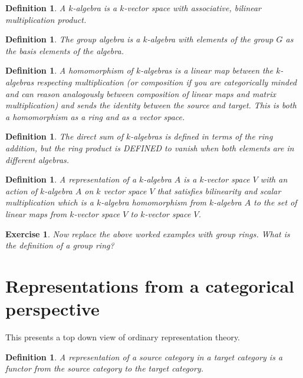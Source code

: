 \documentclass{tufte-book}
\newtheorem{definition}[theorem]{Definition}
\newtheorem{exercise}[theorem]{Exercise}
\begin{document}
\begin{definition}
	A $k$-algebra is a $k$-vector space with associative, bilinear multiplication product.
\end{definition}

\begin{definition}
	The group algebra is a $k$-algebra with elements of the group $G$ as the basis elements of the algebra.
\end{definition}

\begin{definition}
	A homomorphism of $k$-algebras is a linear map between the $k$-algebras respecting multiplication (or composition if you are categorically minded and can reason analogously between composition of linear maps and matrix multiplication) and sends the identity between the source and target. This is both a homomorphism as a ring and as a vector space.
\end{definition}

\begin{definition}
	The direct sum of $k$-algebras is defined in terms of the ring addition, but the ring product is DEFINED to vanish when both elements are in different algebras.
\end{definition}

\begin{definition}
	A representation of a $k$-algebra $A$ is a $k$-vector space $V$ with an action of $k$-algebra $A$ on $k$ vector space $V$ that satisfies bilinearity and scalar multiplication which is a $k$-algebra homomorphism from $k$-algebra $A$ to the set of linear maps from $k$-vector space $V$ to $k$-vector space $V$.
\end{definition}

\begin{exercise}
	Now replace the above worked examples with group rings. What is the definition of a group ring?
\end{exercise}

\section{Representations from a categorical perspective}

This presents a top down view of ordinary representation theory.

\begin{definition}
	A representation of a source category in a target category is a functor from the source category to the target category.
\end{definition}
\end{document}

